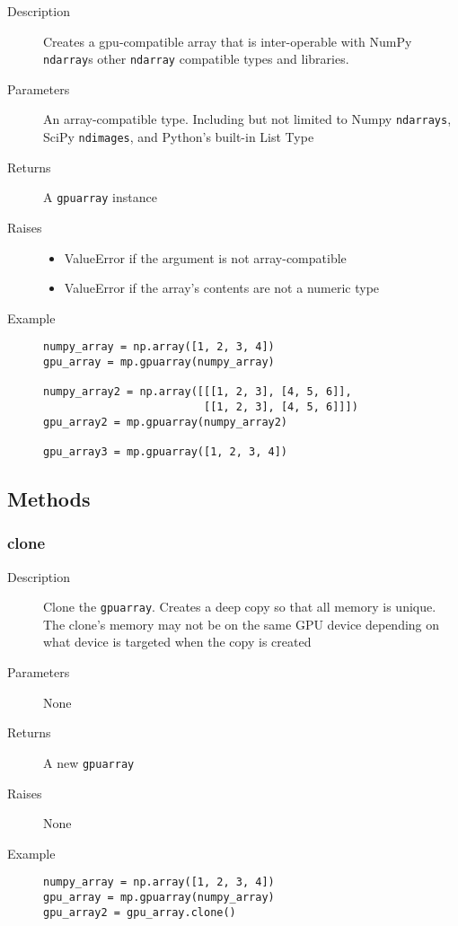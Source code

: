 \begin{description}
   \item[Description] Creates a gpu-compatible array that is inter-operable with NumPy \verb|ndarray|s other \verb|ndarray| compatible types and libraries. 
   \item[Parameters] An array-compatible type. Including but not limited to Numpy \verb|ndarrays|, SciPy \verb|ndimages|, and Python's built-in List Type
   \item[Returns] A \verb|gpuarray| instance
   \item[Raises] \phantom{}
   \begin{itemize}
   \item ValueError if the argument is not array-compatible
   \item ValueError if the array's contents are not a numeric type
   \end{itemize}
   \item[Example] \phantom{}
   \begin{lstlisting}
numpy_array = np.array([1, 2, 3, 4])
gpu_array = mp.gpuarray(numpy_array)

numpy_array2 = np.array([[[1, 2, 3], [4, 5, 6]], 
                         [[1, 2, 3], [4, 5, 6]]])
gpu_array2 = mp.gpuarray(numpy_array2)
                                
gpu_array3 = mp.gpuarray([1, 2, 3, 4])
\end{lstlisting}
\end{description}

\subsection{Methods}

\subsubsection{clone}

\begin{description}
   \item[Description] Clone the \verb|gpuarray|. Creates a deep copy so that all memory is unique. The clone's memory may not be on the same GPU device depending on what device is targeted when the copy is created
   \item[Parameters] None
   \item[Returns] A new \verb|gpuarray|
   \item[Raises] None
   \item[Example] \phantom{}
   \begin{lstlisting}
numpy_array = np.array([1, 2, 3, 4])
gpu_array = mp.gpuarray(numpy_array)
gpu_array2 = gpu_array.clone()
\end{lstlisting}
\end{description}

